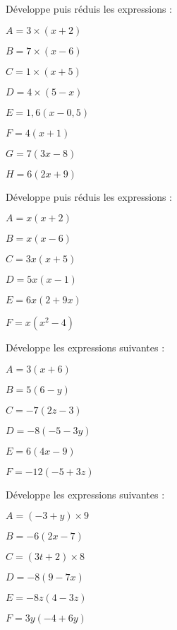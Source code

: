 

\begin{exercice}[]
Développe puis réduis les expressions :
\begin{colenumerate}{2}
\item $A = 3 \times (x + 2)$
\item $B = 7 \times (x - 6)$
\item $C = 1 \times (x + 5)$
\item $D = 4 \times (5 - x)$
\item $E = 1,6(x - 0,5)$
\item $F = 4(x + 1)$
\item $G = 7(3x - 8)$
\item $H = 6(2x + 9)$
\end{colenumerate}
\end{exercice}

\begin{exercice}[]
Développe puis réduis les expressions :
\begin{colenumerate}{2}
\item $A = x(x + 2)$
\item $B = x(x - 6)$
\item $C = 3x(x + 5)$
\item $D = 5x(x - 1)$
\item $E = 6x(2 + 9x)$
\item $F = x(x^2 - 4)$
\end{colenumerate}
\end{exercice}

\begin{exercice}[]
Développe les expressions suivantes :
\begin{colenumerate}{2}
\item $A = 3(x + 6)$
\item $B = 5(6 -y)$
\item $C = -7(2z -3)$
\item $D = -8(-5 -3y)$
\item $E = 6(4x -9)$
\item $F = -12(-5 + 3z)$
\end{colenumerate}
\end{exercice}

\begin{exercice}[]
Développe les expressions suivantes :
\begin{colenumerate}{2}
\item $A = (-3 + y) \times 9$
\item $B = -6(2x -7)$
\item $C = (3t + 2) \times 8$
\item $D = -8(9 -7x)$
\item $E = -8z(4 -3z)$
\item $F = 3y(-4 + 6y)$
\end{colenumerate}
\end{exercice}


